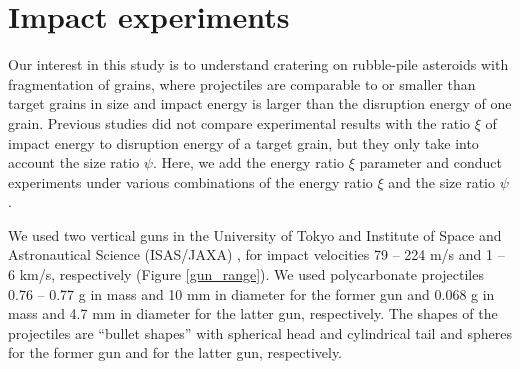 \documentclass[3p,authoryear]{elsarticle}
\begin{document}
 \section{Impact experiments} \label{sec:experiment}
Our interest in this study is to understand cratering on rubble-pile asteroids with fragmentation of grains, where projectiles are comparable to or smaller than target grains in size and impact energy is larger than the disruption energy of one grain.
Previous studies did not compare experimental results with the ratio $\xi$ of impact energy to disruption energy of a target grain, but they only take into account the size ratio $\psi$.
Here, we add the energy ratio $\xi$ parameter and conduct experiments under various combinations of the energy ratio $\xi$ and the size ratio $\psi$.


We used two vertical guns in the University of Tokyo and Institute of Space and Astronautical Science (ISAS/JAXA) , for impact velocities 79 -- 224 m/s and 1 -- 6 km/s, respectively (Figure \ref{gun_range}). We used polycarbonate projectiles 0.76 -- 0.77 g  in mass and 10 mm in diameter for the former gun and 0.068 g in mass and 4.7 mm in diameter for the latter gun, respectively.
The shapes of the projectiles are ``bullet shapes'' with spherical head and cylindrical tail and spheres for the former gun and for the latter gun, respectively.
\end{document}
